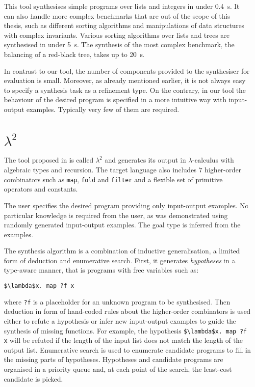 This tool synthesises simple programs over lists and integers in under \SI{0.4}{s}. It can also handle more complex benchmarks that are out of the scope of this thesis, such as different sorting algorithms and manipulations of data structures with complex invariants. Various sorting algorithms over lists and trees are synthesised in under \SI{5}{s}. The synthesis of the most complex benchmark, the balancing of a red-black tree, takes up to \SI{20}{s}.

In contrast to our tool, the number of components provided to the synthesiser for evaluation is small. Moreover, as already mentioned earlier, it is not always easy to specify a synthesis task as a refinement type. On the contrary, in our tool the behaviour of the desired program is specified in a more intuitive way with input-output examples. Typically very few of them are required.

\section{$\lambda^2$}

The tool proposed in \cite{LambdaSquarePaper} is called $\lambda^2$ and generates its output in $\lambda$-calculus with algebraic types and recursion. The target language also includes $7$ higher-order combinators such as \lstinline!map!, \lstinline!fold! and \lstinline!filter! and a flexible set of primitive operators and constants.

The user specifies the desired program providing only input-output examples. No particular knowledge is required from the user, as was demonstrated using randomly generated input-output examples. The goal type is inferred from the examples.

The synthesis algorithm is a combination of inductive generalisation, a limited form of deduction and enumerative search.
First, it generates \emph{hypotheses} in a type-aware manner, that is programs with free variables such as:
\begin{lstlisting}[style=plain]
$\lambda$x. map ?f x
\end{lstlisting}
where \lstinline!?f! is a placeholder for an unknown program to be synthesised.
Then deduction in form of hand-coded rules about the higher-order combinators is used either to refute a hypothesis or infer new input-output examples to guide the synthesis of missing functions. For example, the hypothesis \lstinline!$\lambda$x. map ?f x! will be refuted if the length of the input list does not match the length of the output list.
Enumerative search is used to enumerate candidate programs to fill in the missing parts of hypotheses. Hypotheses and candidate programs are organised in a priority queue and, at each point of the search, the least-cost candidate is picked.

